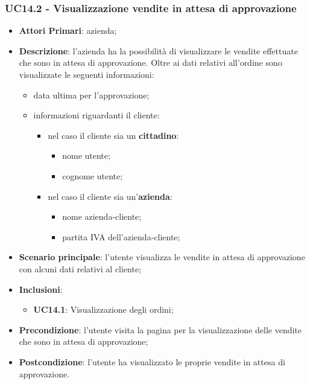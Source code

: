 \subsubsection{UC14.2 - Visualizzazione vendite in attesa di approvazione}
\begin{itemize}
	\item \textbf{Attori Primari}: azienda;
	\item \textbf{Descrizione}: l'azienda ha la possibilità di visualizzare le vendite effettuate che sono in attesa di approvazione. Oltre ai dati relativi all'ordine sono visualizzate le seguenti informazioni:
	\begin{itemize}
		\item data ultima per l'approvazione;
		\item informazioni riguardanti il cliente:
		\begin{itemize}
			\item nel caso il cliente sia un \textbf{cittadino}:
			\begin{itemize}
				
				\item nome utente;
				\item cognome utente;
			\end{itemize}
				\item nel caso il cliente sia un'\textbf{azienda}:
			\begin{itemize}
				
				\item nome azienda-cliente;
				\item partita IVA dell'azienda-cliente;
			\end{itemize}
		\end{itemize}
		
	\end{itemize}
	\item \textbf{Scenario principale}: l'utente visualizza le vendite in attesa di approvazione con alcuni dati relativi al cliente; 
		
		\item \textbf{Inclusioni}:
	\begin{itemize}
		\item \textbf{UC14.1}: Visualizzazione degli ordini;
	\end{itemize}
	\item \textbf{Precondizione}: l'utente visita la pagina per la visualizzazione delle vendite che sono in attesa di approvazione;
	\item \textbf{Postcondizione}: l'utente ha visualizzato le proprie vendite in attesa di approvazione.
\end{itemize} 

